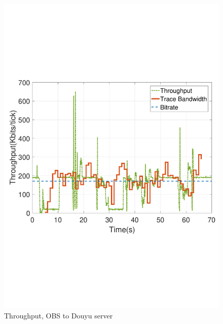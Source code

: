 \begin{figure}[htb]
  \includegraphics[width=\linewidth]{fig/obs_douyu.pdf}
  \caption{Throughput, OBS to Douyu server}
  \label{fig:obs-douyu}
\endminipage\hfill
{}

\end{figure}
